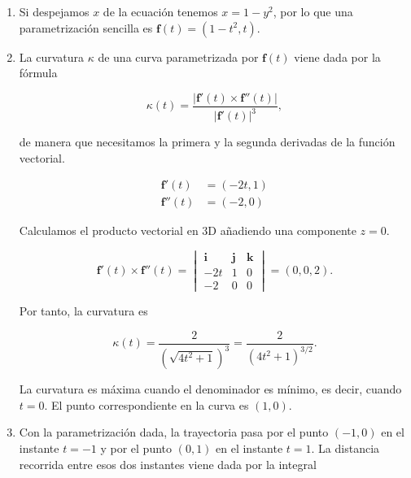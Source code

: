 \documentclass[
  spanish,
  a4paper,
]{scrreport}
\theoremstyle{definition}
\theoremstyle{remark}
\begin{document}
\begin{tcolorbox}[enhanced jigsaw, arc=.35mm, bottomrule=.15mm, bottomtitle=1mm, breakable, colback=white, colbacktitle=quarto-callout-tip-color!10!white, colframe=quarto-callout-tip-color-frame, coltitle=black, left=2mm, leftrule=.75mm, opacityback=0, opacitybacktitle=0.6, rightrule=.15mm, title=\textcolor{quarto-callout-tip-color}{\faLightbulb}\hspace{0.5em}{Solución}, titlerule=0mm, toprule=.15mm, toptitle=1mm]

\begin{enumerate}
\def\labelenumi{\alph{enumi}.}
\item
  Si despejamos \(x\) de la ecuación tenemos \(x=1-y^2\), por lo que una
  parametrización sencilla es \(\mathbf{f}(t) = (1 - t^2, t)\).
\item
  La curvatura \(\kappa\) de una curva parametrizada por
  \(\mathbf{f}(t)\) viene dada por la fórmula

  \[
  \kappa(t)
  = \frac{|\mathbf{f}'(t)\times \mathbf{f}''(t)|}{|\mathbf{f}'(t)|^3},
  \]

  de manera que necesitamos la primera y la segunda derivadas de la
  función vectorial.

  \begin{align*}
  \mathbf{f}'(t) &= (-2t, 1) \\
  \mathbf{f}''(t) &= (-2, 0)
  \end{align*}

  Calculamos el producto vectorial en 3D añadiendo una componente
  \(z=0\).

  \[
  \mathbf{f}'(t)\times \mathbf{f}''(t)
  = \begin{vmatrix}
  \mathbf{i} & \mathbf{j} & \mathbf{k} \\
  -2t & 1 & 0 \\
  -2 & 0 & 0
  \end{vmatrix}
  = (0, 0, 2).
  \]

  Por tanto, la curvatura es

  \[
  \kappa(t)
  = \frac{2}{\left(\sqrt{4t^2+1}\right)^3}
  = \frac{2}{(4t^2+1)^{3/2}}.
  \]

  La curvatura es máxima cuando el denominador es mínimo, es decir,
  cuando \(t=0\). El punto correspondiente en la curva es \((1,0)\).
\item
  Con la parametrización dada, la trayectoria pasa por el punto
  \((-1,0)\) en el instante \(t=-1\) y por el punto \((0,1)\) en el
  instante \(t=1\). La distancia recorrida entre esos dos instantes
  viene dada por la integral
\end{enumerate}


\end{tcolorbox}
\end{document}
